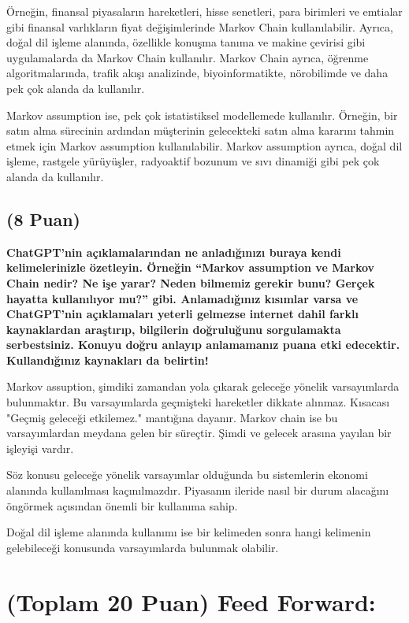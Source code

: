 \documentclass[11pt]{article}
\begin{document}
Örneğin, finansal piyasaların hareketleri, hisse senetleri, para birimleri ve emtialar gibi finansal varlıkların fiyat değişimlerinde Markov Chain kullanılabilir. Ayrıca, doğal dil işleme alanında, özellikle konuşma tanıma ve makine çevirisi gibi uygulamalarda da Markov Chain kullanılır. Markov Chain ayrıca, öğrenme algoritmalarında, trafik akışı analizinde, biyoinformatikte, nörobilimde ve daha pek çok alanda da kullanılır.

Markov assumption ise, pek çok istatistiksel modellemede kullanılır. Örneğin, bir satın alma sürecinin ardından müşterinin gelecekteki satın alma kararını tahmin etmek için Markov assumption kullanılabilir. Markov assumption ayrıca, doğal dil işleme, rastgele yürüyüşler, radyoaktif bozunum ve sıvı dinamiği gibi pek çok alanda da kullanılır.

\subsection{(8 Puan)} \textbf{ChatGPT’nin açıklamalarından ne anladığınızı buraya kendi kelimelerinizle özetleyin. Örneğin ``Markov assumption ve Markov Chain nedir? Ne işe yarar? Neden bilmemiz gerekir bunu? Gerçek hayatta kullanılıyor mu?'' gibi. Anlamadığınız kısımlar varsa ve ChatGPT’nin açıklamaları yeterli gelmezse internet dahil farklı kaynaklardan araştırıp, bilgilerin doğruluğunu sorgulamakta serbestsiniz. Konuyu doğru anlayıp anlamamanız puana etki edecektir. Kullandığınız kaynakları da belirtin!}

Markov assuption, şimdiki zamandan yola çıkarak geleceğe yönelik varsayımlarda bulunmaktır. Bu varsayımlarda geçmişteki hareketler dikkate alınmaz. Kısacası "Geçmiş geleceği etkilemez." mantığına dayanır. Markov chain ise bu varsayımlardan meydana gelen bir süreçtir. Şimdi ve gelecek arasına yayılan bir işleyişi vardır. 

Söz konusu geleceğe yönelik varsayımlar olduğunda bu sistemlerin ekonomi alanında kullanılması kaçınılmazdır. Piyasanın ileride nasıl bir durum alacağını öngörmek açısından önemli bir kullanıma sahip. 

Doğal dil işleme alanında kullanımı ise bir kelimeden sonra hangi kelimenin gelebileceği konusunda varsayımlarda bulunmak olabilir. 

\section{(Toplam 20 Puan) Feed Forward:}
 
\end{document}
